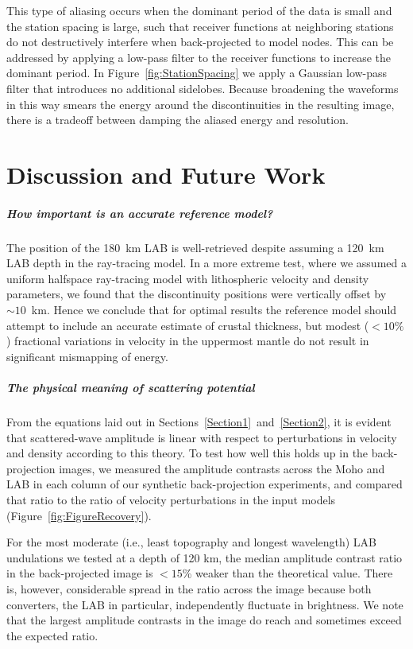 \documentclass[referee]{gji}
\begin{document}
This type of aliasing occurs when the dominant period of the data is small and the station spacing is large, such that receiver functions at neighboring stations do not destructively interfere when back-projected to model nodes.  This can be addressed by applying a low-pass filter to the receiver functions to increase the dominant period.  In Figure~\ref{fig:StationSpacing} we apply a Gaussian low-pass filter that introduces no additional sidelobes. Because broadening the waveforms in this way smears the energy around the discontinuities in the resulting image, there is a tradeoff between damping the aliased energy and resolution.

\section{Discussion and Future Work}
\label{Section3}

\subparagraph{How important is an accurate reference model?}
The position of the 180~km LAB is well-retrieved despite assuming a 120~km LAB depth in the ray-tracing model.  In a more extreme test, where we assumed a uniform halfspace ray-tracing model with lithospheric velocity and density parameters, we found that the discontinuity positions were vertically offset by $\sim10$~km.  Hence we conclude that for optimal results the reference model should attempt to include an accurate estimate of crustal thickness, but modest ($<10\%$) fractional variations in velocity in the uppermost mantle do not result in significant mismapping of energy.

\subparagraph{The physical meaning of scattering potential}

From the equations laid out in Sections~\ref{Section1}~and~\ref{Section2}, it is evident that scattered-wave amplitude is linear with respect to perturbations in velocity and density according to this theory.  To test how well this holds up in the back-projection images, we measured the amplitude contrasts across the Moho and LAB in each column of our synthetic back-projection experiments, and compared that ratio to the ratio of velocity perturbations in the input models (Figure~\ref{fig:FigureRecovery}).

For the most moderate (i.e., least topography and longest wavelength) LAB undulations we tested at a depth of 120 km, the median amplitude contrast ratio in the back-projected image is $<15$\% weaker than the theoretical value.  There is, however, considerable spread in the ratio across the image because both converters, the LAB in particular, independently fluctuate in brightness.  We note that the largest amplitude contrasts in the image do reach and sometimes exceed the expected ratio.
\end{document}
